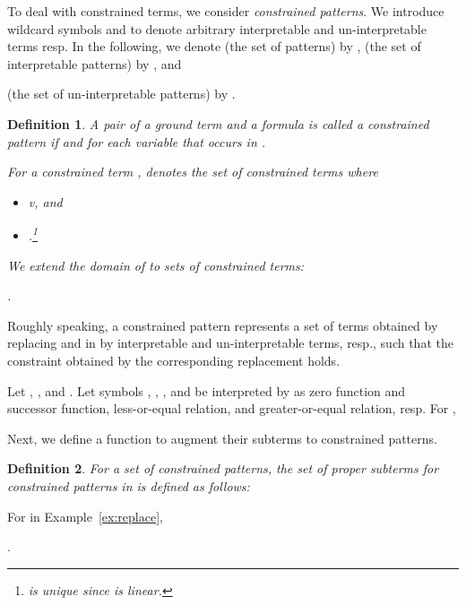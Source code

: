 \documentclass[copyright,creativecommons]{eptcs}
\newtheorem{definition}{Definition}
\begin{document}
To deal with constrained terms, we consider \emph{constrained
patterns}. 
We introduce wildcard symbols  and 
to denote arbitrary interpretable and un-interpretable terms
resp.
In the following, we denote
 (the set of patterns)
by , 
 (the set of interpretable patterns) by
, and

(the set of un-interpretable patterns) by . 
\begin{definition}
A pair of a ground term  
  and a formula  is called a \emph{constrained
 pattern} if  and    for
 each variable  that occurs in . 

 For a constrained term , 
 denotes the set of constrained terms  where
\begin{itemize}
\item   v\square\blacksquare, and
 \item   .\footnote{  is unique since  is linear. }
\end{itemize}
We extend the domain of  to sets of
 constrained terms:
 
 .
\end{definition}
Roughly speaking, a constrained pattern 
 represents a set of terms obtained by replacing  and
  in  by interpretable and un-interpretable terms,
 resp., such that the constraint obtained by the corresponding
 replacement holds.
\begin{example}
 \label{ex:replace}
Let   ,   , 
and   .
Let symbols , , , and  be 
interpreted by  as zero function and successor function, 
less-or-equal relation, and greater-or-equal relation, resp.
 For   ,

\end{example}

Next, we define a function to augment their subterms to constrained patterns. 
\begin{definition}
For a set  of constrained patterns, 
the set  of proper subterms for constrained patterns in
  is defined as follows: 

\end{definition}
\begin{example}
For  in Example~\ref{ex:replace}, 

 .
\end{example}
\end{document}
